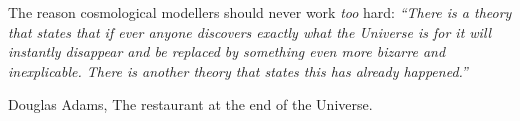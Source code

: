 \documentclass[a4paper, 11pt, twoside]{Thesis} %
\begin{document}
\normalsize
\clearpage  %
\vfill\null %

\pagestyle{empty}  %

\null\vfill
The reason cosmological modellers should never work \textit{too} hard: \newline \textit{``There is a theory that states that if ever anyone discovers exactly what the Universe is for it will instantly disappear and be replaced by something even more bizarre and inexplicable. There is another theory that states this has already happened.''}

\begin{flushright}
Douglas Adams, The restaurant at the end of the Universe.
\end{flushright}

\vfill\vfill\vfill\vfill\vfill\vfill\null
\clearpage  %
\pagestyle{fancy}  %



\pagestyle{fancy}  %


\tableofcontents  %

\listoffigures  %

\listoftables  %
\end{document}
